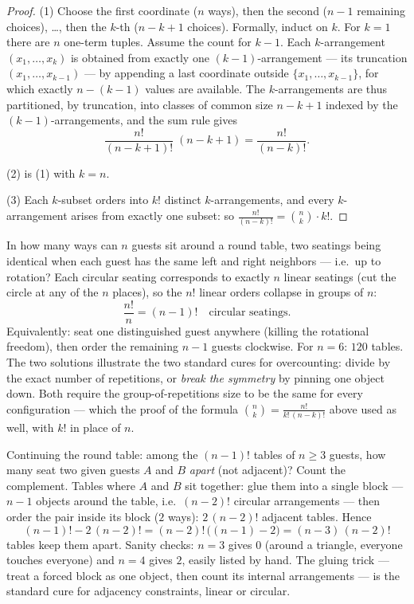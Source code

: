 \begin{proof}
(1) Choose the first coordinate ($n$ ways), then the second ($n - 1$
remaining choices), \dots, then the $k$-th ($n - k + 1$ choices).
Formally, induct on $k$. For $k = 1$ there are $n$ one-term
 tuples. Assume the count for $k - 1$. Each
$k$-arrangement $(x_1, \dots, x_k)$ is obtained from exactly one
$(k-1)$-arrangement --- its truncation $(x_1, \dots, x_{k-1})$
--- by appending a last coordinate outside $\{x_1, \dots,
x_{k-1}\}$, for which exactly $n - (k - 1)$ values are available.
The $k$-arrangements are thus partitioned, by truncation, into
classes of common size $n - k + 1$ indexed by the
$(k-1)$-arrangements, and the sum rule gives
\[
\frac{n!}{(n-k+1)!}\;(n - k + 1) = \frac{n!}{(n-k)!} .
\]

(2) is (1) with $k = n$.

(3) Each $k$-subset orders into $k!$ distinct $k$-arrangements, and
every $k$-arrangement arises from exactly one subset: so
$\frac{n!}{(n-k)!} = \binom nk \cdot k!$.
\end{proof}

\begin{example}\label{ex:b1:counting:roundtable}
In how many ways can $n$ guests sit around a round table, two
seatings being identical when each guest has the same left and
right neighbors --- i.e.\ up to rotation? Each circular seating
corresponds to exactly $n$ linear seatings (cut the circle at any
of the $n$ places), so the $n!$ linear orders collapse in groups
of $n$:
\[
\frac{n!}{n} = (n-1)! \quad\text{circular seatings.}
\]
Equivalently: seat one distinguished guest anywhere (killing the
rotational freedom), then order the remaining $n - 1$ guests
clockwise. For $n = 6$: $120$ tables. The two solutions illustrate
the two standard cures for overcounting: divide by the exact
number of repetitions, or \emph{break the symmetry} by pinning one
object down. Both require the group-of-repetitions size to be the
same for every configuration --- which the proof of the formula
$\binom nk = \frac{n!}{k!\,(n-k)!}$ above used as well, with
$k!$ in place of $n$.
\end{example}

\begin{example}\label{ex:b1:counting:constraint}
Continuing the round table: among the $(n-1)!$ tables of $n \geq
3$ guests, how many seat two given guests $A$ and $B$ \emph{apart}
(not adjacent)? Count the complement. Tables where $A$ and $B$
sit together: glue them into a single block --- $n - 1$ objects
around the table, i.e.\ $(n-2)!$ circular arrangements --- then
order the pair inside its block ($2$ ways): $2\,(n-2)!$ adjacent
tables. Hence
\[
(n-1)! - 2\,(n-2)! = (n-2)!\,\bigl((n - 1) - 2\bigr)
= (n-3)\,(n-2)!
\]
tables keep them apart. Sanity checks: $n = 3$ gives $0$ (around
a triangle, everyone touches everyone) and $n = 4$ gives $2$,
easily listed by hand. The gluing trick --- treat a forced block
as one object, then count its internal arrangements --- is the
standard cure for adjacency constraints, linear or circular.
\end{example}

